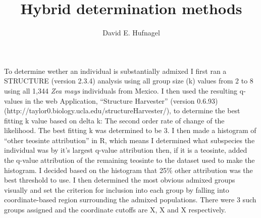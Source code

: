 \documentclass[11pt]{amsart}
\title{Hybrid determination methods}
\author{David E. Hufnagel}
\begin{document}
\maketitle

To determine wether an individual is substantially admixed I first ran a STRUCTURE (version 2.3.4) analysis using all group size (k) values from 2 to 8 using all 1,344 \textit{Zea mays} individuals from Mexico.  I then used the resulting q-values in 
the web Application, ``Structure Harvester'' (version 0.6.93)(http://taylor0.biology.ucla.edu/structureHarvester/), to determine the best fitting k value based on delta k: The second order rate of change of the likelihood.  The best fitting k was determined to be 3.  I then made a histogram of ``other teosinte attribution'' in R, which means I determined what subspecies the individual was by it's largest q-value attribution then, if it is a teosinte, added the q-value attribution of the remaining teosinte to the dataset used to make the histogram.  I decided based on the histogram that 25\% other attribution was the best threshold to use.  I then determined the most obvious admixed groups visually and set the criterion for inclusion into each group by falling into coordinate-based region surrounding the admixed populations.  There were 3 such groups assigned and the coordinate cutoffs are X, X and X respectively.
\end{document}
